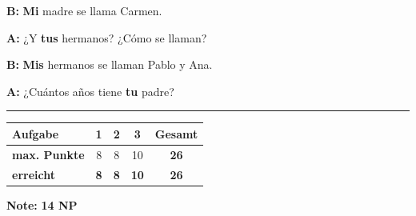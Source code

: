 \documentclass[11pt, a4paper]{article}
\newcommand{\lsg}[1]{\textcolor{loesung}{\textbf{#1}}}
\begin{document}
\noindent
\textbf{B:} \lsg{Mi} madre se llama Carmen.

\vspace{0.8em}

\noindent
\textbf{A:} ¿Y \lsg{tus} hermanos? ¿Cómo se llaman?

\vspace{0.8em}

\noindent
\textbf{B:} \lsg{Mis} hermanos se llaman Pablo y Ana.

\vspace{0.8em}

\noindent
\textbf{A:} ¿Cuántos años tiene \lsg{tu} padre?


\vspace{25pt}
\hrule
\vspace{10pt}

\noindent
\begin{tabularx}{\textwidth}{|X|c|c|c||c|}
\hline
\textbf{Aufgabe} & 1 & 2 & 3 & \textbf{Gesamt} \\
\hline
\textbf{max. Punkte} & 8 & 8 & 10 & \textbf{26} \\
\hline
\textbf{erreicht} & \lsg{8} & \lsg{8} & \lsg{10} & \lsg{26} \\[0.8em]
\hline
\end{tabularx}

\vspace{10pt}

\begin{flushright}
\textbf{Note:} \lsg{14 NP}
\end{flushright}
\end{document}
